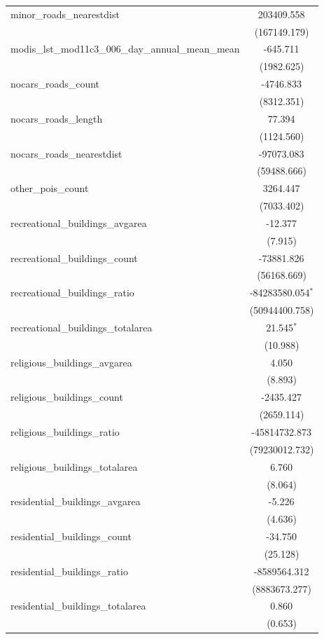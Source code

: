 \begin{table}[!htbp]
\begin{tabular}{@{\extracolsep{5pt}}lc}
 minor_roads_nearestdist & 203409.558$^{}$ \\
  & (167149.179) \\
 modis_lst_mod11c3_006_day_annual_mean_mean & -645.711$^{}$ \\
  & (1982.625) \\
 nocars_roads_count & -4746.833$^{}$ \\
  & (8312.351) \\
 nocars_roads_length & 77.394$^{}$ \\
  & (1124.560) \\
 nocars_roads_nearestdist & -97073.083$^{}$ \\
  & (59488.666) \\
 other_pois_count & 3264.447$^{}$ \\
  & (7033.402) \\
 recreational_buildings_avgarea & -12.377$^{}$ \\
  & (7.915) \\
 recreational_buildings_count & -73881.826$^{}$ \\
  & (56168.669) \\
 recreational_buildings_ratio & -84283580.054$^{*}$ \\
  & (50944400.758) \\
 recreational_buildings_totalarea & 21.545$^{*}$ \\
  & (10.988) \\
 religious_buildings_avgarea & 4.050$^{}$ \\
  & (8.893) \\
 religious_buildings_count & -2435.427$^{}$ \\
  & (2659.114) \\
 religious_buildings_ratio & -45814732.873$^{}$ \\
  & (79230012.732) \\
 religious_buildings_totalarea & 6.760$^{}$ \\
  & (8.064) \\
 residential_buildings_avgarea & -5.226$^{}$ \\
  & (4.636) \\
 residential_buildings_count & -34.750$^{}$ \\
  & (25.128) \\
 residential_buildings_ratio & -8589564.312$^{}$ \\
  & (8883673.277) \\
 residential_buildings_totalarea & 0.860$^{}$ \\
  & (0.653) \\

\end{tabular}
\end{table}
